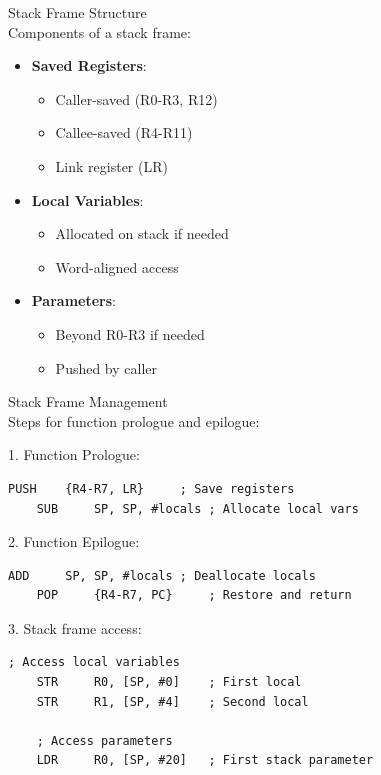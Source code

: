 \begin{definition}{Stack Frame Structure}\\
Components of a stack frame:
\begin{itemize}
  \item \textbf{Saved Registers}:
    \begin{itemize}
      \item Caller-saved (R0-R3, R12)
      \item Callee-saved (R4-R11)
      \item Link register (LR)
    \end{itemize}
  \item \textbf{Local Variables}:
    \begin{itemize}
      \item Allocated on stack if needed
      \item Word-aligned access
    \end{itemize}
  \item \textbf{Parameters}:
    \begin{itemize}
      \item Beyond R0-R3 if needed
      \item Pushed by caller
    \end{itemize}
\end{itemize}

\end{definition}

\begin{KR}{Stack Frame Management}\\
Steps for function prologue and epilogue:

1. Function Prologue:
\begin{lstlisting}[language=armasm, style=base]
    PUSH    {R4-R7, LR}     ; Save registers
    SUB     SP, SP, #locals ; Allocate local vars
\end{lstlisting}

2. Function Epilogue:
\begin{lstlisting}[language=armasm, style=base]
    ADD     SP, SP, #locals ; Deallocate locals
    POP     {R4-R7, PC}     ; Restore and return
\end{lstlisting}

3. Stack frame access:
\begin{lstlisting}[language=armasm, style=base]
    ; Access local variables
    STR     R0, [SP, #0]    ; First local
    STR     R1, [SP, #4]    ; Second local
    
    ; Access parameters
    LDR     R0, [SP, #20]   ; First stack parameter
\end{lstlisting}
\end{KR}

